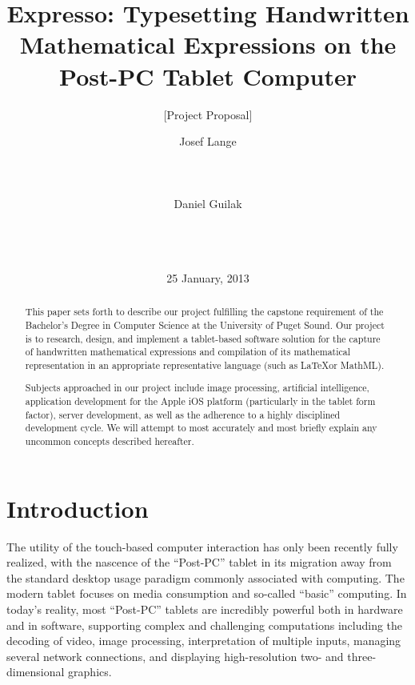 \documentclass{acm_proc_article-sp}
\begin{document}
\title{ Expresso: Typesetting Handwritten Mathematical Expressions on the Post-PC Tablet Computer }
\subtitle{[Project Proposal]}


\author{
\alignauthor
Josef Lange\\
       \\
       \\
       \\
\alignauthor       
Daniel Guilak\\
       \\
       \\
       \\
}
       
\date{25 January, 2013}

\maketitle

\begin{abstract}
This paper sets forth to describe our project fulfilling the capstone requirement of the Bachelor's Degree in Computer Science at the University of Puget Sound. Our project is to research, design, and implement a tablet-based software solution for the capture of handwritten mathematical expressions and compilation of its mathematical representation in an appropriate representative language (such as \LaTeX or MathML).

Subjects approached in our project include image processing, artificial intelligence, application development for the Apple iOS platform (particularly in the tablet form factor), server development, as well as the adherence to a highly disciplined development cycle. We will attempt to most accurately and most briefly explain any uncommon concepts described hereafter.
\end{abstract}

\section{Introduction}
The utility of the touch-based computer interaction has only been recently fully realized, with the nascence of the ``Post-PC'' tablet in its migration away from the standard desktop usage paradigm commonly associated with computing. The modern tablet focuses on media consumption and so-called ``basic'' computing. In today's reality, most ``Post-PC'' tablets are incredibly powerful both in hardware and in software, supporting complex and challenging computations including the decoding of video, image processing, interpretation of multiple inputs, managing several network connections, and displaying high-resolution two- and three-dimensional graphics.
\end{document}
